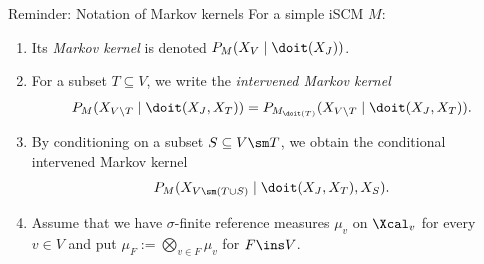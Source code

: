 
\begin{frame}{Reminder: Notation of Markov kernels}
  For a simple iSCM $M$:
  \begin{enumerate}
    \item Its \emph{Markov kernel} is denoted $P_{M}(X_V \mid \doit(X_J))$.
    \item For a subset $T \subseteq V$, we write the \emph{intervened Markov kernel}
      $$P_{M}(X_{V\setminus T} \mid \doit(X_J,X_T)) = P_{M_{\doit(T)}}(X_{V\setminus T} \mid \doit(X_J,X_T)).$$
    \item By conditioning on a subset $S \subseteq V \sm T$, we obtain the conditional intervened Markov kernel
      $$P_{M}(X_{V\sm (T \cup S)} \mid \doit(X_J,X_T), X_S).$$
    \item Assume that we have $\sigma$-finite reference measures $\mu_v$ on $\Xcal_v$ for every $v \in V$
      and put $\mu_F := \bigotimes_{v \in F} \mu_v$ for $F \ins V$.
  \end{enumerate}
\end{frame}

